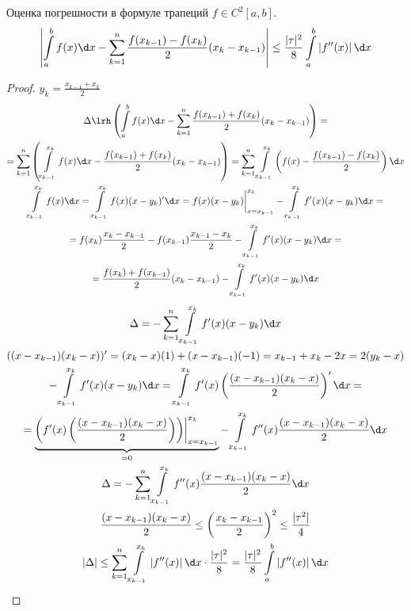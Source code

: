 \begin{theorem}{Оценка погрешности в формуле трапеций}
	$f \in C^2[a, b]$.
	\[ \left| \int\limits_a^b f(x)\d x - \sum_{k=1}^n \frac{f(x_{k-1}) - f(x_k)}{2}(x_k - x_{k-1}) \right| \le \frac{|\tau|^2}8 \int\limits_a^b \left|f''(x)\right|\d x \]
\end{theorem}
\begin{proof}
	$y_k = \frac{x_{k-1} + x_k}2$
	\begin{gather*}
		\Delta \lrh \left(\int\limits_a^b f(x)\d x - \sum_{k=1}^n \frac{f(x_{k-1}) + f(x_k)}{2}(x_k - x_{k-1}) \right) = \\
		= \sum_{k=1}^n \left(\int\limits_{x_{k-1}}^{x_k} f(x)\d x - \frac{f(x_{k-1}) + f(x_k)}{2}(x_k - x_{k-1}) \right)
			= \sum_{k=1}^n \int\limits_{x_{k-1}}^{x_k} \left(f(x) - \frac{f(x_{k-1}) - f(x_k)}{2}\right)\d x \\
		\int\limits_{x_{k-1}}^{x_k} f(x) \d x = \int\limits_{x_{k-1}}^{x_k} f(x)(x - y_k)'\d x = f(x) (x-y_k) \biggr|_{x=x_{k-1}}^{x_k} - \int\limits_{x_{k-1}}^{x_k} f'(x)(x-y_k)\d x = \\
		= f(x_k) \frac{x_k - x_{k-1}}2 - f(x_{k-1}) \frac{x_{k-1} - x_k}2 - \int\limits_{x_{k-1}}^{x_k} f'(x)(x-y_k)\d x = \\
		= \frac{f(x_k) + f(x_{k-1})}2 (x_k - x_{k-1}) - \int\limits_{x_{k-1}}^{x_k} f'(x)(x-y_k)\d x \\
	\end{gather*}
	\begin{gather*}
		\Delta = -\sum_{k=1}^n \int\limits_{x_{k-1}}^{x_k} f'(x)(x-y_k)\d x \\
		((x - x_{k-1})(x_k - x))' = (x_k - x)(1) + (x - x_{k-1})(-1) = x_{k-1} + x_k - 2x = 2(y_k - x) \\
		-\int\limits_{x_{k-1}}^{x_k} f'(x)(x-y_k)\d x = \int\limits_{x_{k-1}}^{x_k} f'(x)\left(\frac{(x - x_{k-1})(x_k - x)}2\right)'\d x = \\
		= \underbrace{\left(f'(x)\left(\frac{(x - x_{k-1})(x_k - x)}2\right)\right)\biggr|_{x = x_{k-1}}^{x_k}}_{=0} - \int\limits_{x_{k-1}}^{x_k} f''(x) \frac{(x - x_{k-1})(x_k - x)}2 \d x \\
		\Delta = -\sum_{k=1}^n \int\limits_{x_{k-1}}^{x_k} f''(x) \frac{(x - x_{k-1})(x_k - x)}2 \d x \\
		\frac{(x - x_{k-1})(x_k - x)}2 \le \left(\frac{x_k - x_{k-1}}2\right)^2 \le \frac{|\tau^2|}4 \\
		|\Delta| \le \sum_{k=1}^n \int\limits_{x_{k-1}}^{x_k} \left|f''(x)\right| \d x \cdot \frac{|\tau|^2}8 = \frac{|\tau|^2}8 \int\limits_a^b \left|f''(x)\right|\d x
	\end{gather*}
\end{proof}

